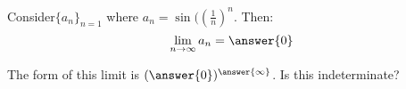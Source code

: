 \documentclass{ximera}
\author{Jim Talamo}
\begin{document}
\begin{exercise}


Consider$\{a_n \}_{n=1}$ where $a_n = \sin(\left(\frac{1}{n}\right)^{n}$.  Then:
\[
\lim_{n \to \infty} a_n = \answer{0}
\]

\begin{hint}
The form of this limit is $(\answer{0})^{\answer{\infty}}$.  Is this indeterminate?
\end{hint}
\end{exercise}
\end{document}

